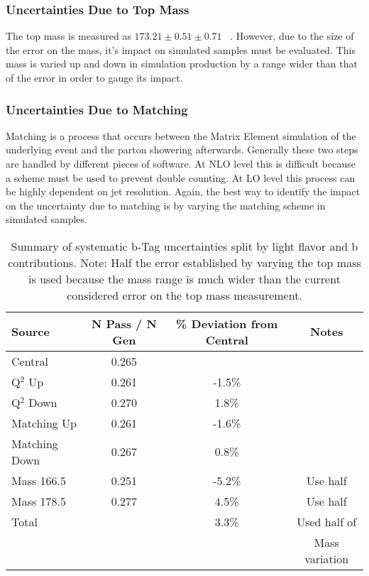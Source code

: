 \subsubsection{Uncertainties Due to Top Mass}
The top mass is measured as $173.21 \pm 0.51 \pm 0.71$ \GeV~\cite{pdg}. However, due to the size of the error on the mass, it's impact on simulated samples must be evaluated. This mass is varied up and down in simulation production by a range wider than that of the error in order to gauge its impact.\\


\subsubsection{Uncertainties Due to Matching}
Matching is a process that occurs between the Matrix Element simulation of the underlying event and the parton showering afterwards. Generally these two steps are handled by different pieces of software. At NLO level this is difficult because a scheme must be used to prevent double counting. At LO level this process can be highly dependent on jet resolution. Again, the best way to identify the impact on the uncertainty due to matching is by varying the matching scheme in simulated samples.\\


\begin{table}[h]
\begin{center}
\caption{\small\label{tab:systupdown} Summary of systematic b-Tag uncertainties split by light flavor and b contributions. Note: Half the error established by varying the top mass is used because the mass range is much wider than the current considered error on the top mass measurement.}
\begin{tabular}{lccc}\hline
Source                  &  N Pass / N Gen & \% Deviation from Central & Notes\\ \hline
Central                 & 0.265 & & \\
Q$^2$ Up                 & 0.261 & -1.5\% & \\
Q$^2$ Down           & 0.270 & 1.8\% & \\
Matching Up       & 0.261 & -1.6\% & \\
Matching Down  & 0.267 & 0.8\% & \\
Mass 166.5         & 0.251 & -5.2\% & Use half \\
Mass 178.5         & 0.277 & 4.5\% & Use half \\
\hline
Total                     &             & 3.3\% & Used half of\\
                              &             &             & Mass variation \\
\hline
\end{tabular}
\end{center}
\end{table}



